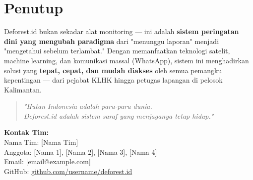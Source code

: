 \documentclass[11pt,a4paper]{article}
\begin{document}
\section{Penutup}

Deforest.id bukan sekadar alat monitoring --- ini adalah \textbf{sistem peringatan dini yang mengubah paradigma} dari "menunggu laporan" menjadi "mengetahui sebelum terlambat." Dengan memanfaatkan teknologi satelit, machine learning, dan komunikasi massal (WhatsApp), sistem ini menghadirkan solusi yang \textbf{tepat, cepat, dan mudah diakses} oleh semua pemangku kepentingan --- dari pejabat KLHK hingga petugas lapangan di pelosok Kalimantan.

\begin{quotation}
\centering
\textit{"Hutan Indonesia adalah paru-paru dunia.\\
Deforest.id adalah sistem saraf yang menjaganya tetap hidup."}
\end{quotation}

\vspace{1cm}
\noindent
\textbf{Kontak Tim:}\\
Nama Tim: [Nama Tim]\\
Anggota: [Nama 1], [Nama 2], [Nama 3], [Nama 4]\\
Email: [email@example.com]\\
GitHub: \href{https://github.com/}{github.com/username/deforest.id}

\end{document}
